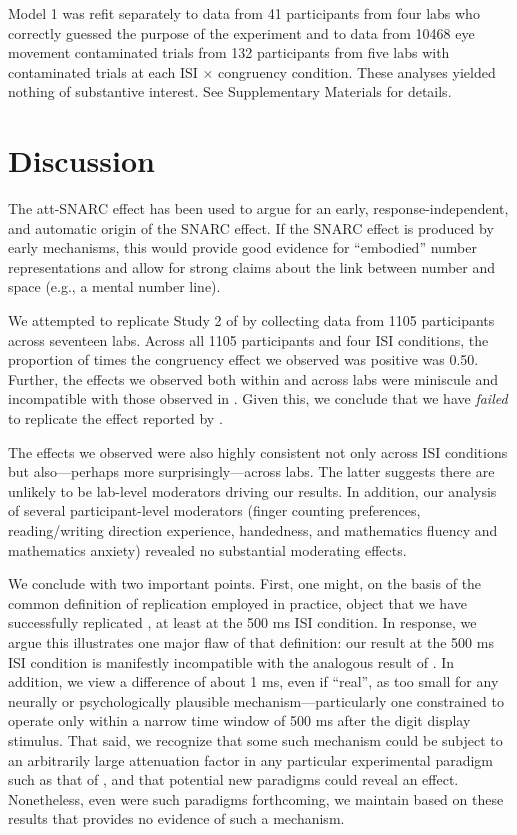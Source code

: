 \documentclass[A4paper,man,floatsintext]{apa6}
\theoremstyle{definition}
\theoremstyle{definition}
\theoremstyle{definition}
\theoremstyle{remark}
\begin{document}
Model 1 was refit separately to data from 41 participants from four labs
who correctly guessed the purpose of the experiment and to data from
10468 eye movement contaminated trials from 132 participants from five
labs with contaminated trials at each ISI \(\times\) congruency
condition. These analyses yielded nothing of substantive interest. See
Supplementary Materials for details.

\section{Discussion}\label{discussion}

The att-SNARC effect \autocite{Fischer:2003ju} has been used to argue
for an early, response-independent, and automatic origin of the SNARC
effect. If the SNARC effect is produced by early mechanisms, this would
provide good evidence for \enquote{embodied} number representations and
allow for strong claims about the link between number and space (e.g., a
mental number line).

We attempted to replicate Study 2 of \textcite{Fischer:2003ju} by
collecting data from 1105 participants across seventeen labs. Across all
1105 participants and four ISI conditions, the proportion of times the
congruency effect we observed was positive was 0.50. Further, the
effects we observed both within and across labs were miniscule and
incompatible with those observed in \textcite{Fischer:2003ju}. Given
this, we conclude that we have \emph{failed} to replicate the effect
reported by \textcite{Fischer:2003ju}.

The effects we observed were also highly consistent not only across ISI
conditions but also---perhaps more surprisingly---across labs. The
latter suggests there are unlikely to be lab-level moderators driving
our results. In addition, our analysis of several participant-level
moderators (finger counting preferences, reading/writing direction
experience, handedness, and mathematics fluency and mathematics anxiety)
revealed no substantial moderating effects.

We conclude with two important points. First, one might, on the basis of
the common definition of replication employed in practice, object that
we have successfully replicated \textcite{Fischer:2003ju}, at least at
the 500 ms ISI condition. In response, we argue this illustrates one
major flaw of that definition: our result at the 500 ms ISI condition is
manifestly incompatible with the analogous result of
\textcite{Fischer:2003ju}. In addition, we view a difference of about 1
ms, even if \enquote{real}, as too small for any neurally or
psychologically plausible mechanism---particularly one constrained to
operate only within a narrow time window of 500 ms after the digit
display stimulus. That said, we recognize that some such mechanism could
be subject to an arbitrarily large attenuation factor in any particular
experimental paradigm such as that of \textcite{Fischer:2003ju}, and
that potential new paradigms could reveal an effect. Nonetheless, even
were such paradigms forthcoming, we maintain based on these results that
\textcite{Fischer:2003ju} provides no evidence of such a mechanism.
\end{document}
